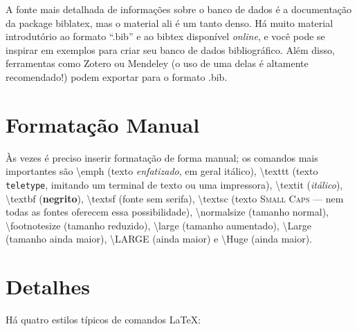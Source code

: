 A fonte mais detalhada de informações sobre o banco de dados é a
documentação da package biblatex, mas o material ali é um tanto denso.
Há muito material introdutório ao formato ``.bib'' e ao bibtex disponível
\emph{online}, e você pode se inspirar em exemplos para criar seu banco de
dados bibliográfico. Além disso, ferramentas como Zotero ou
Mendeley (o uso de uma delas é altamente recomendado!)
podem exportar para o formato .bib.

\section{Formatação Manual}

Às vezes é preciso inserir formatação de forma manual; os comandos mais
importantes são \textsf{\textbackslash{}emph} (texto \emph{enfatizado}, em geral
itálico), \textsf{\textbackslash{}texttt} (texto \texttt{teletype}, imitando um
terminal de texto ou uma impressora), \textsf{\textbackslash{}textit}
(\textit{itálico}), \textsf{\textbackslash{}textbf} (\textbf{negrito}),
\textsf{\textbackslash{}textsf} (fonte \textsf{sem serifa}),
\textsf{\textbackslash{}textsc} (texto \textsc{Small Caps} --- nem todas
as fontes oferecem essa possibilidade),
\textsf{\textbackslash{}normalsize} (tamanho normal),
\textsf{\textbackslash{}footnotesize} (tamanho reduzido),
\textsf{\textbackslash{}large} (tamanho aumentado),
\textsf{\textbackslash{}Large} (tamanho ainda maior),
\textsf{\textbackslash{}LARGE} (ainda maior) e
\textsf{\textbackslash{}Huge} (ainda maior).

\section{Detalhes}

Há quatro estilos típicos de comandos \LaTeX{}:

